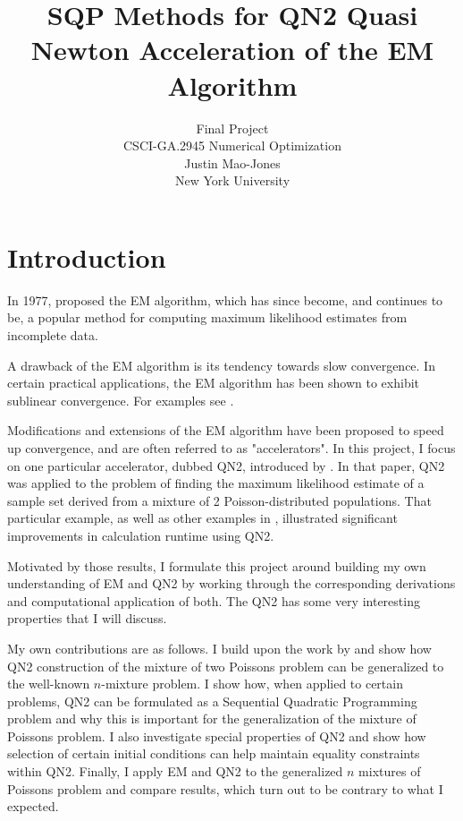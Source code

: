 \documentclass[letter,12pt]{article}
\begin{document}
\title{SQP Methods for QN2 Quasi Newton Acceleration of the EM Algorithm}
\author{Final Project\\CSCI-GA.2945 Numerical Optimization\\Justin Mao-Jones\\New York University}
\renewcommand{\today}{December 14, 2014}
\maketitle

\section{Introduction}

In 1977, \citeauthor*{dempsterlr77} proposed the EM algorithm, which has since become, and continues to be, a popular method for computing maximum likelihood estimates from incomplete data.  

A drawback of the EM algorithm is its tendency towards slow convergence.  In certain practical applications, the EM algorithm has been shown to exhibit sublinear convergence.  For examples see \cite{lange1995a,jamshidianj93,jamshidianj97}.

Modifications and extensions of the EM algorithm have been proposed to speed up convergence, and are often referred to as "accelerators".  In this project, I focus on one particular accelerator, dubbed QN2, introduced by \cite{jamshidianj97}.  In that paper, QN2 was applied to the problem of finding the maximum likelihood estimate of a sample set derived from a mixture of 2 Poisson-distributed populations.  That particular example, as well as other examples in \cite{jamshidianj97}, illustrated significant improvements in calculation runtime using QN2.

Motivated by those results, I formulate this project around building my own understanding of EM and QN2 by working through the corresponding derivations and computational application of both.  The QN2 has some very interesting properties that I will discuss.

My own contributions are as follows.  I build upon the work by \cite{jamshidianj97} and show how QN2 construction of the mixture of two Poissons problem can be generalized to the well-known $n$-mixture problem.  I show how, when applied to certain problems, QN2 can be formulated as a Sequential Quadratic Programming problem and why this is important for the generalization of the mixture of Poissons problem.  I also investigate special properties of QN2 and show how selection of certain initial conditions can help maintain equality constraints within QN2.  Finally, I apply EM and QN2 to the generalized $n$ mixtures of Poissons problem and compare results, which turn out to be contrary to what I expected. 
\end{document}
